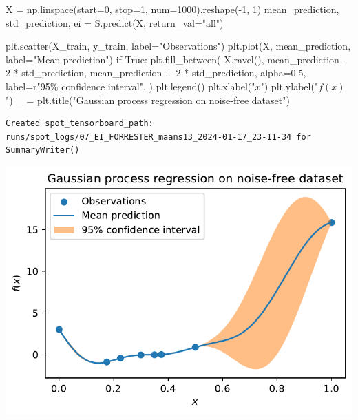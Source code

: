 \documentclass[
  letterpaper,
  DIV=11,
  numbers=noendperiod]{scrreprt}
\newenvironment{Shaded}{\begin{snugshade}}{\end{snugshade}}
\newcommand{\ControlFlowTok}[1]{\textcolor[rgb]{0.00,0.23,0.31}{#1}}
\newcommand{\DecValTok}[1]{\textcolor[rgb]{0.68,0.00,0.00}{#1}}
\newcommand{\FloatTok}[1]{\textcolor[rgb]{0.68,0.00,0.00}{#1}}
\newcommand{\NormalTok}[1]{\textcolor[rgb]{0.00,0.23,0.31}{#1}}
\newcommand{\OperatorTok}[1]{\textcolor[rgb]{0.37,0.37,0.37}{#1}}
\newcommand{\SpecialCharTok}[1]{\textcolor[rgb]{0.37,0.37,0.37}{#1}}
\newcommand{\StringTok}[1]{\textcolor[rgb]{0.13,0.47,0.30}{#1}}
\newcommand{\VariableTok}[1]{\textcolor[rgb]{0.07,0.07,0.07}{#1}}
\newcommand{\VerbatimStringTok}[1]{\textcolor[rgb]{0.13,0.47,0.30}{#1}}
\begin{document}
\begin{Shaded}
\begin{Highlighting}[]
\NormalTok{X }\OperatorTok{=}\NormalTok{ np.linspace(start}\OperatorTok{=}\DecValTok{0}\NormalTok{, stop}\OperatorTok{=}\DecValTok{1}\NormalTok{, num}\OperatorTok{=}\DecValTok{1000}\NormalTok{).reshape(}\OperatorTok{{-}}\DecValTok{1}\NormalTok{, }\DecValTok{1}\NormalTok{)}
\NormalTok{mean\_prediction, std\_prediction, ei }\OperatorTok{=}\NormalTok{ S.predict(X, return\_val}\OperatorTok{=}\StringTok{"all"}\NormalTok{)}

\NormalTok{plt.scatter(X\_train, y\_train, label}\OperatorTok{=}\StringTok{"Observations"}\NormalTok{)}
\NormalTok{plt.plot(X, mean\_prediction, label}\OperatorTok{=}\StringTok{"Mean prediction"}\NormalTok{)}
\ControlFlowTok{if} \VariableTok{True}\NormalTok{:}
\NormalTok{    plt.fill\_between(}
\NormalTok{        X.ravel(),}
\NormalTok{        mean\_prediction }\OperatorTok{{-}} \DecValTok{2} \OperatorTok{*}\NormalTok{ std\_prediction,}
\NormalTok{        mean\_prediction }\OperatorTok{+} \DecValTok{2} \OperatorTok{*}\NormalTok{ std\_prediction,}
\NormalTok{        alpha}\OperatorTok{=}\FloatTok{0.5}\NormalTok{,}
\NormalTok{        label}\OperatorTok{=}\VerbatimStringTok{r"95}\SpecialCharTok{\% c}\VerbatimStringTok{onfidence interval"}\NormalTok{,}
\NormalTok{    )}
\NormalTok{plt.legend()}
\NormalTok{plt.xlabel(}\StringTok{"$x$"}\NormalTok{)}
\NormalTok{plt.ylabel(}\StringTok{"$f(x)$"}\NormalTok{)}
\NormalTok{\_ }\OperatorTok{=}\NormalTok{ plt.title(}\StringTok{"Gaussian process regression on noise{-}free dataset"}\NormalTok{)}
\end{Highlighting}
\end{Shaded}

\begin{verbatim}
Created spot_tensorboard_path: runs/spot_logs/07_EI_FORRESTER_maans13_2024-01-17_23-11-34 for SummaryWriter()
\end{verbatim}

\includegraphics{012_num_spot_ei_files/figure-pdf/cell-47-output-2.pdf}
\end{document}
